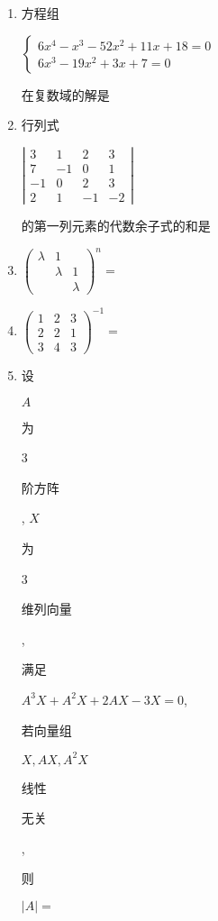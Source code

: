 \documentclass[10pt]{article}
\begin{document}
\begin{enumerate}
  \item \begin{CJK}{UTF8}{mj}方程组\end{CJK} $\left\{\begin{array}{c}6 x^{4}-x^{3}-52 x^{2}+11 x+18=0 \\ 6 x^{3}-19 x^{2}+3 x+7=0\end{array}\right.$ \begin{CJK}{UTF8}{mj}在复数域的解是\end{CJK}

  \item \begin{CJK}{UTF8}{mj}行列式\end{CJK} $\left|\begin{array}{cccc}3 & 1 & 2 & 3 \\ 7 & -1 & 0 & 1 \\ -1 & 0 & 2 & 3 \\ 2 & 1 & -1 & -2\end{array}\right|$ \begin{CJK}{UTF8}{mj}的第一列元素的代数余子式的和是\end{CJK}

  \item $\left(\begin{array}{lll}\lambda & 1 & \\ & \lambda & 1 \\ & & \lambda\end{array}\right)^{n}=$

  \item $\left(\begin{array}{lll}1 & 2 & 3 \\ 2 & 2 & 1 \\ 3 & 4 & 3\end{array}\right)^{-1}=$

  \item \begin{CJK}{UTF8}{mj}设\end{CJK} $A$ \begin{CJK}{UTF8}{mj}为\end{CJK} 3 \begin{CJK}{UTF8}{mj}阶方阵\end{CJK}, $X$ \begin{CJK}{UTF8}{mj}为\end{CJK} 3 \begin{CJK}{UTF8}{mj}维列向量\end{CJK}, \begin{CJK}{UTF8}{mj}满足\end{CJK} $A^{3} X+A^{2} X+2 A X-3 X=0$, \begin{CJK}{UTF8}{mj}若向量组\end{CJK} $X, A X, A^{2} X$ \begin{CJK}{UTF8}{mj}线性\end{CJK} \begin{CJK}{UTF8}{mj}无关\end{CJK}, \begin{CJK}{UTF8}{mj}则\end{CJK} $|A|=$


\end{enumerate}
\end{document}

